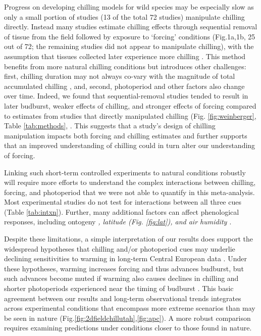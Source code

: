 \documentclass{article}
\begin{document}
\par Progress on developing chilling models for wild species may be especially slow as only a small portion of studies (13 of the total 72 studies) manipulate chilling directly. Instead many studies estimate chilling effects through sequential removal of tissue from the field followed by exposure to `forcing' conditions (Fig.1a,1b, 25 out of 72; the remaining studies did not appear to manipulate chilling), with the assumption that tissues collected later experience more chilling \emph{\citep{weinberger1950}}. This method benefits from more natural chilling conditions but introduces other challenges: first, chilling duration may not always co-vary with the magnitude of total accumulated chilling \emph{\citep{dennis2003}}, and, second, photoperiod and other factors also change over time. Indeed, we found that sequential-removal studies tended to result in later budburst, weaker effects of chilling, and stronger effects of forcing compared to estimates from studies that directly manipulated chilling (Fig. \ref{fig:weinberger}, Table \ref{tab:methods}, \emph{\citep{weinberger1950,polgar2013}}. This suggests that a study's design of chilling manipulation impacts both forcing and chilling estimates and further supports that an improved understanding of chilling could in turn alter our understanding of forcing. 

\par Linking such short-term controlled experiments to natural conditions robustly will require more efforts to understand the complex interactions between chilling, forcing, and photoperiod that we were not able to quantify in this meta-analysis. Most experimental studies do not test for interactions between all three cues (Table \ref{tab:intxn}). Further, many additional factors can affect phenological responses, including ontogeny \emph{\citep[Table \ref{tab:stage},][]{vitasse2013ont}, latitude (Fig. \ref{fig:lat}), and air humidity \citep{Laube:2014b}}. 
\par Despite these limitations, a simple interpretation of our results does support the widespread hypotheses that chilling and/or photoperiod cues may underlie declining sensitivities to warming in long-term Central European data \emph{\citep{fu2015,Rutishauser:2008,yu2010}}. Under these hypotheses, warming increases forcing and thus advances budburst, but such advances become muted if warming also causes declines in chilling and shorter photoperiods experienced near the timing of budburst \emph{\citep{gauzere2019}}. This basic agreement between our results and long-term observational trends integrates across experimental conditions that encompass more extreme scenarios than may be seen in nature (Fig.\ref{fig:2dfieldchillutah},\ref{fig:apc}). A more robust comparison requires examining predictions under conditions closer to those found in nature.
\end{document}

